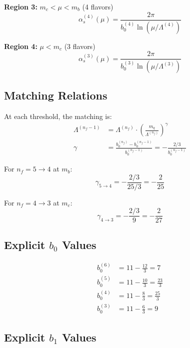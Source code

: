 \documentclass[11pt,a4paper]{article}
\theoremstyle{definition}
\begin{document}
\textbf{Region 3:} $m_c < \mu < m_b$ (4 flavors)
\begin{equation}
\label{eq:app-49}
\alpha_s^{(4)}(\mu) = \frac{2\pi}{b_0^{(4)}\ln(\mu/\Lambda^{(4)})}
\end{equation}

\textbf{Region 4:} $\mu < m_c$ (3 flavors)
\begin{equation}
\label{eq:app-50}
\alpha_s^{(3)}(\mu) = \frac{2\pi}{b_0^{(3)}\ln(\mu/\Lambda^{(3)})}
\end{equation}

\subsection{Matching Relations}
\label{subsec:app-matching-rel}

At each threshold, the matching is:
\begin{align}
\label{eq:app-51}
\Lambda^{(n_f-1)} &= \Lambda^{(n_f)} \cdot \left(\frac{m_q}{\Lambda^{(n_f)}}\right)^{\gamma} \\
\label{eq:app-52}
\gamma &= \frac{b_0^{(n_f)} - b_0^{(n_f-1)}}{b_0^{(n_f-1)}} = -\frac{2/3}{b_0^{(n_f-1)}}
\end{align}

For $n_f = 5 \to 4$ at $m_b$:
\begin{equation}
\label{eq:app-53}
\gamma_{5\to4} = -\frac{2/3}{25/3} = -\frac{2}{25}
\end{equation}

For $n_f = 4 \to 3$ at $m_c$:
\begin{equation}
\label{eq:app-54}
\gamma_{4\to3} = -\frac{2/3}{9} = -\frac{2}{27}
\end{equation}

\subsection{Explicit $b_0$ Values}
\label{subsec:app-b0-values}

\begin{align}
\label{eq:app-55}
b_0^{(6)} &= 11 - \frac{12}{3} = 7 \\
\label{eq:app-56}
b_0^{(5)} &= 11 - \frac{10}{3} = \frac{23}{3} \\
\label{eq:app-57}
b_0^{(4)} &= 11 - \frac{8}{3} = \frac{25}{3} \\
\label{eq:app-58}
b_0^{(3)} &= 11 - \frac{6}{3} = 9
\end{align}

\subsection{Explicit $b_1$ Values}
\label{subsec:app-b1-values}
\end{document}
